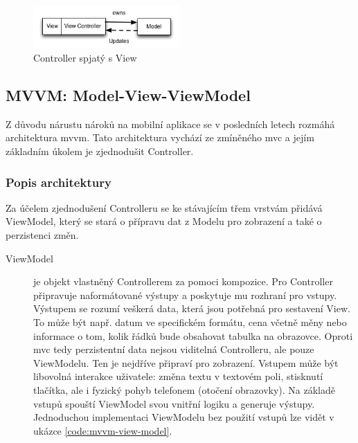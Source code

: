 \begin{figure}\centering
	\includegraphics[width=0.5\textwidth]{assets/mvc-massive-view-controller.png}
	\caption[Role Controlleru v MVC]{Controller spjatý s View}\label{fig:massive-mvc}
\end{figure}

\subsection{MVVM: Model-View-ViewModel}\label{analyza-mvvm}

Z důvodu nárustu nároků na mobilní aplikace se v posledních letech rozmáhá architektura \acrshort{mvvm}.
Tato architektura vychází ze zmíněného \acrshort{mvc} a jejím základním úkolem je zjednodušit Controller.

\subsubsection*{Popis architektury} \label{architektura-mvvm-popis}

Za účelem zjednodušení Controlleru se ke stávajícím třem vrstvám přidává ViewModel, který se stará o přípravu dat z Modelu pro zobrazení a také o perzistenci změn.

\begin{description}
  \item[ViewModel] je objekt vlastněný Controllerem za pomoci kompozice.
  Pro Controller připravuje naformátované výstupy a poskytuje mu rozhraní pro vstupy.
  Výstupem se rozumí veškerá data, která jsou potřebná pro sestavení View.
  To může být např. datum ve specifickém formátu, cena včetně měny nebo informace o tom, kolik řádků bude obsahovat tabulka na obrazovce.
  Oproti \acrshort{mvc} tedy perzistentní data nejsou viditelná Controlleru, ale pouze ViewModelu.
  Ten je nejdříve připraví pro zobrazení.
  Vstupem může být libovolná interakce uživatele:
  změna textu v textovém poli, stisknutí tlačítka, ale i fyzický pohyb telefonem (otočení obrazovky).
  Na základě vstupů spouští ViewModel svou vnitřní logiku a generuje výstupy.
  Jednoduchou implementaci ViewModelu bez použití vstupů lze vidět v ukázce \ref{code:mvvm-view-model}.
\end{description}

